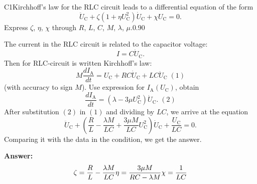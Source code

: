 \documentclass[11pt,a4paper]{article}
\begin{document}
\begin{solcard}{C1}{Kirchhoff's law for the RLC circuit leads to a differential equation of the form $$\ddot{U}_\text{C} + \zeta(1+\eta U_\text{C}^2)\dot{U}_\text{C}+\chi U_\text{C} = 0.$$Express $\zeta$, $\eta$, $\chi$ through $R$, $L$, $C$, $M$, $\lambda$, $\mu$.}{0.90}

The current in the RLC circuit is related to the capacitor voltage: $$I = C\dot{U}_\text{C}.$$Then for RLC-circuit is written Kirchhoff's law: $$M \frac{dI_\text{A}}{dt} = U_\text{C} + RC\dot{U}_\text{C} + LC \ddot{U}_\text{C} \;(\text{1})$$(with accuracy to sign $M$). Use expression for $I_\text{A}(U_\text{C})$, obtain $$\frac{dI_\text{A}}{dt} = \left(\lambda - 3\mu U_\text{C}^2\right)\dot{U}_\text{C}. \;(\text{2})$$After substitution $(2)$ in $(1)$ and dividing by $LC$, we arrive at the equation $$\ddot{U}_\text{C} + \left(\frac{R}{L} - \frac{\lambda M}{LC} +\frac{3\mu M}{LC}U_\text{C}^2 \right) \dot{U}_\text{C} + \frac{U_\text{C}}{LC} = 0.$$Comparing it with the data in the condition, we get the answer.

\par\smallskip\noindent\textbf{Answer:} $$\zeta = \frac{R}{L} - \frac{\lambda M}{LC} \\ \ \\ \eta = \frac{3\mu M}{RC - \lambda M} \\ \ \\\chi = \frac{1}{LC}$$
\end{solcard}
\end{document}
